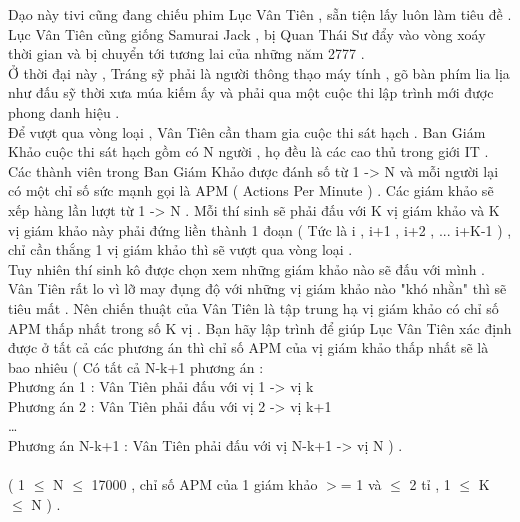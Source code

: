 Dạo này tivi cũng đang chiếu phim Lục Vân Tiên , sẵn tiện lấy luôn làm tiêu đề .   
\\   Lục Vân Tiên cũng giống Samurai Jack , bị Quan Thái Sư đẩy vào vòng xoáy thời gian và bị chuyển tới tương lai của những năm 2777 .   
\\   Ở thời đại này , Tráng sỹ phải là người thông thạo máy tính , gõ bàn phím lia lịa như đấu sỹ thời xưa múa kiếm ấy và phải qua một cuộc thi lập trình mới được phong danh hiệu .   
\\   Để vượt qua vòng loại , Vân Tiên cần tham gia cuộc thi sát hạch . Ban Giám Khảo cuộc thi sát hạch gồm có N người , họ đều là các cao thủ trong giới IT . Các thành viên trong Ban Giám Khảo được đánh số từ 1 -> N và mỗi người lại có một chỉ số sức mạnh gọi là APM ( Actions Per Minute ) . Các giám khảo sẽ xếp hàng lần lượt từ 1 -> N . Mỗi thí sinh sẽ phải đấu với K vị giám khảo và K vị giám khảo này phải đứng liền thành 1 đoạn ( Tức là i , i+1 , i+2 , ... i+K-1 ) , chỉ cần thắng 1 vị giám khảo thì sẽ vượt qua vòng loại .   
\\   Tuy nhiên thí sinh kô được chọn xem những giám khảo nào sẽ đấu với mình .   
\\   Vân Tiên rất lo vì lỡ may đụng độ với những vị giám khảo nào "khó nhằn" thì sẽ tiêu mất . Nên chiến thuật của Vân Tiên là tập trung hạ vị giám khảo có chỉ số APM thấp nhất trong số K vị . Bạn hãy lập trình để giúp Lục Vân Tiên xác định được ở tất cả các phương án thì chỉ số APM của vị giám khảo thấp nhất sẽ là bao nhiêu ( Có tất cả N-k+1 phương án :   
\\   Phương án 1 : Vân Tiên phải đấu với vị 1 -> vị k   
\\   Phương án 2 : Vân Tiên phải đấu với vị 2 -> vị k+1   
\\   …   
\\   Phương án N-k+1  : Vân Tiên phải đấu với vị N-k+1 -> vị N ) .   
\\
\\   ( 1  $\le$  N  $\le$  17000 , chỉ số APM của 1 giám khảo $>$= 1 và  $\le$  2 tỉ , 1  $\le$  K  $\le$  N ) .